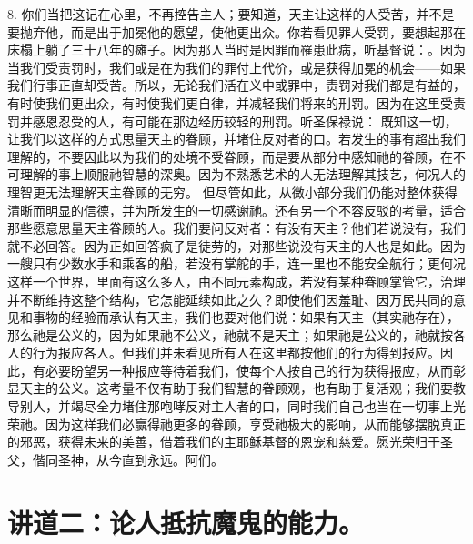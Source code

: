8. 你们当把这记在心里，不再控告主人；要知道，天主让这样的人受苦，并不是要抛弃他，而是出于加冕他的愿望，使他更出众。你若看见罪人受罚，要想起那在床榻上躺了三十八年的瘫子。因为那人当时是因罪而罹患此病，听基督说：。因为当我们受责罚时，我们或是在为我们的罪付上代价，或是获得加冕的机会——如果我们行事正直却受苦。所以，无论我们活在义中或罪中，责罚对我们都是有益的，有时使我们更出众，有时使我们更自律，并减轻我们将来的刑罚。因为在这里受责罚并感恩忍受的人，有可能在那边经历较轻的刑罚。听圣保禄说： 既知这一切，让我们以这样的方式思量天主的眷顾，并堵住反对者的口。若发生的事有超出我们理解的，不要因此以为我们的处境不受眷顾，而是要从部分中感知祂的眷顾，在不可理解的事上顺服祂智慧的深奥。因为不熟悉艺术的人无法理解其技艺，何况人的理智更无法理解天主眷顾的无穷。 但尽管如此，从微小部分我们仍能对整体获得清晰而明显的信德，并为所发生的一切感谢祂。还有另一个不容反驳的考量，适合那些愿意思量天主眷顾的人。我们要问反对者：有没有天主？他们若说没有，我们就不必回答。因为正如回答疯子是徒劳的，对那些说没有天主的人也是如此。因为一艘只有少数水手和乘客的船，若没有掌舵的手，连一里也不能安全航行；更何况这样一个世界，里面有这么多人，由不同元素构成，若没有某种眷顾掌管它，治理并不断维持这整个结构，它怎能延续如此之久？即使他们因羞耻、因万民共同的意见和事物的经验而承认有天主，我们也要对他们说：如果有天主（其实祂存在），那么祂是公义的，因为如果祂不公义，祂就不是天主；如果祂是公义的，祂就按各人的行为报应各人。但我们并未看见所有人在这里都按他们的行为得到报应。因此，有必要盼望另一种报应等待着我们，使每个人按自己的行为获得报应，从而彰显天主的公义。这考量不仅有助于我们智慧的眷顾观，也有助于复活观；我们要教导别人，并竭尽全力堵住那咆哮反对主人者的口，同时我们自己也当在一切事上光荣祂。因为这样我们必赢得祂更多的眷顾，享受祂极大的影响，从而能够摆脱真正的邪恶，获得未来的美善，借着我们的主耶稣基督的恩宠和慈爱。愿光荣归于圣父，偕同圣神，从今直到永远。阿们。\par


\section{讲道二：论人抵抗魔鬼的能力。}

\par

